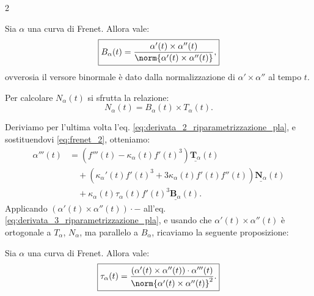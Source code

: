 \begin{multicols*}{2}
    \begin{proposition}
        Sia $\alpha$ una curva di Frenet. Allora vale:
        \[
            \boxed{B_\alpha(t) = \frac{\alpha'(t) \times \alpha''(t)}{\norm{\alpha'(t) \times \alpha''(t)}},}
        \]
        ovverosia il versore binormale è dato dalla normalizzazione
        di $\alpha' \times \alpha''$ al tempo $t$.
    \end{proposition}

    \begin{remark}
        Per calcolare $N_\alpha(t)$ si sfrutta la relazione:
        \[ \boxed{N_\alpha(t) = B_\alpha(t) \times T_\alpha(t).} \]
    \end{remark}

    \begin{remark}
        Deriviamo per l'ultima volta l'eq. \eqref{eq:derivata_2_riparametrizzazione_pla}, e sostituendovi
        \eqref{eq:frenet_2}, otteniamo:
        \begin{equation} \label{eq:derivata_3_riparametrizzazione_pla}
            \begin{aligned}
                \alpha'''(t) & = \left(f'''(t) - \kappa_\alpha(t) f'(t)^3\right) \underline{\mathbf{T}_\alpha}(t)                                  \\
                             & \quad + \left({\kappa_\alpha}'(t) f'(t)^3 + 3 \kappa_\alpha(t) f'(t) f''(t)\right) \underline{\mathbf{N}_\alpha}(t) \\
                             & \quad + \kappa_\alpha(t) \tau_\alpha(t) f'(t)^3 \underline{\mathbf{B}_\alpha}(t).
            \end{aligned}
        \end{equation}
        Applicando $(\alpha'(t) \times \alpha''(t)) \cdot -$ all'eq. \eqref{eq:derivata_3_riparametrizzazione_pla},
        e usando che $\alpha'(t) \times \alpha''(t)$ è
        ortogonale a $T_\alpha$, $N_\alpha$, ma parallelo a $B_\alpha$, ricaviamo la seguente proposizione:
    \end{remark}

    \begin{proposition}
        Sia $\alpha$ una curva di Frenet. Allora vale:
        \[
            \boxed{\tau_\alpha(t) = \frac{(\alpha'(t) \times \alpha''(t)) \cdot \alpha'''(t)}{\norm{\alpha'(t) \times \alpha''(t)}^2}.}
        \]
    \end{proposition}


\end{multicols*}
